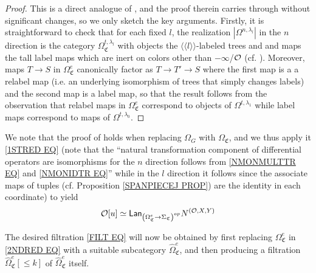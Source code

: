 \documentclass[a4paper,10pt
,draft
]{article}%
\renewcommand{\1}{\eta}%
\begin{document}
\begin{proof}
This is a direct analogue of \cite[Prop. 5.41]{BP_geo}, and the proof therein carries through without significant changes, so we only sketch the key arguments.
Firstly, it is straightforward to check that for each fixed $l$,
the realization $|\Omega^{n,\lambda_l}|$
in the $n$ direction is the category 
$\Omega^{t,\lambda_l}_{\mathfrak{C}}$
with objects the $\langle \langle l \rangle \rangle$-labeled trees and and maps the tall label maps which are inert on colors other than $-\infty$/$\mathcal{O}$ (cf. \cite[Rem. 5.36]{BP_geo}).
Moreover, maps 
$T \to S$
in 
$\Omega^e_{\mathfrak{C}}$
canonically factor 
as
$T \to T' \to S$
where the first map is a a relabel map (i.e. an underlying isomorphism of trees that simply changes labels) and the second map is a label map, 
so that the result follows from the observation that relabel maps in 
$\Omega^e_{\mathfrak{C}}$
correspond to objects of  
$\Omega^{t,\lambda_1}$
while label maps correspond to maps of
$\Omega^{t,\lambda_0}$.
\end{proof}


We note that the proof of \cite[Prop 5.37]{BP_geo} %
holds when replacing $\Omega_G$ with $\Omega_{\mathfrak C}$,
and we thus 
apply it
\eqref{1STRED EQ}
(note that the ``natural transformation component of differential operators are isomorphisms for the $n$ direction follows from \eqref{NMONMULTTR EQ} and \eqref{NMONIDTR EQ}''
while in the $l$ direction it follows since the associate maps of tuples (cf. Proposition \ref{SPANPIECEJ PROP}) are the identity in each coordinate)
to yield
\begin{equation}\label{2NDRED EQ}
\mathcal{O}[u] \simeq
	\mathsf{Lan}_{\left(\Omega_{\mathfrak C}^{e} \to
	\Sigma_{\mathfrak C}\right)^{op}} N^{(\mathcal{O},X,Y)}
\end{equation}

The desired filtration \eqref{FILT EQ} will now be obtained by
first replacing $\Omega_{\mathfrak C}^e$ in \eqref{2NDRED EQ} with a suitable subcategory $\widehat{\Omega}_{\mathfrak C}^{e}$,
and then producing a filtration
$\widehat{\Omega}_{\mathfrak C}^{e}[\leq k]$
of 
$\widehat{\Omega}_{\mathfrak C}^{e}$ itself.

\end{document}
